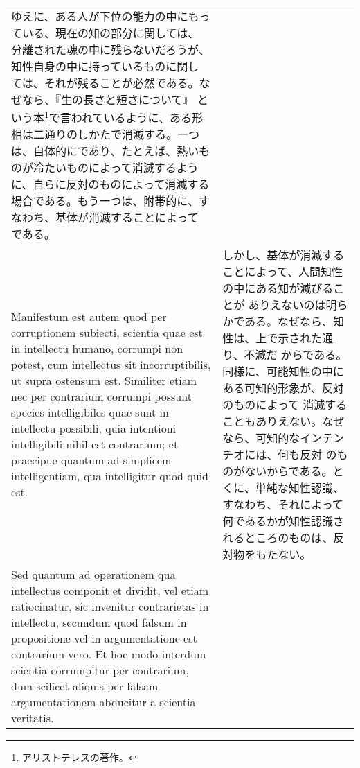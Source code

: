 \documentclass[10pt]{jsarticle} %
\begin{document}
\begin{longtable}{p{21em}p{21em}}
ゆえに、ある人が下位の能力の中にもっている、現在の知の部分に関しては、
分離された魂の中に残らないだろうが、知性自身の中に持っているものに関し
ては、それが残ることが必然である。なぜなら、『生の長さと短さについて』
という本\footnote{アリストテレスの著作。}で言われているように、ある形
相は二通りのしかたで消滅する。一つは、自体的にであり、たとえば、熱いも
のが冷たいものによって消滅するように、自らに反対のものによって消滅する
場合である。もう一つは、附帯的に、すなわち、基体が消滅することによって
である。

\\



Manifestum est autem quod per corruptionem subiecti, scientia quae est
in intellectu humano, corrumpi non potest, cum intellectus sit
incorruptibilis, ut supra ostensum est. Similiter etiam nec per
contrarium corrumpi possunt species intelligibiles quae sunt in
intellectu possibili, quia intentioni intelligibili nihil est
contrarium; et praecipue quantum ad simplicem intelligentiam, qua
intelligitur quod quid est.

&

しかし、基体が消滅することによって、人間知性の中にある知が滅びることが
ありえないのは明らかである。なぜなら、知性は、上で示された通り、不滅だ
からである。同様に、可能知性の中にある可知的形象が、反対のものによって
消滅することもありえない。なぜなら、可知的なインテンチオには、何も反対
のものがないからである。とくに、単純な知性認識、すなわち、それによって
何であるかが知性認識されるところのものは、反対物をもたない。

\\

Sed quantum ad operationem qua intellectus componit et dividit, vel
etiam ratiocinatur, sic invenitur contrarietas in intellectu, secundum
quod falsum in propositione vel in argumentatione est contrarium
vero. Et hoc modo interdum scientia corrumpitur per contrarium, dum
scilicet aliquis per falsam argumentationem abducitur a scientia
veritatis.



\end{longtable}
\end{document}
